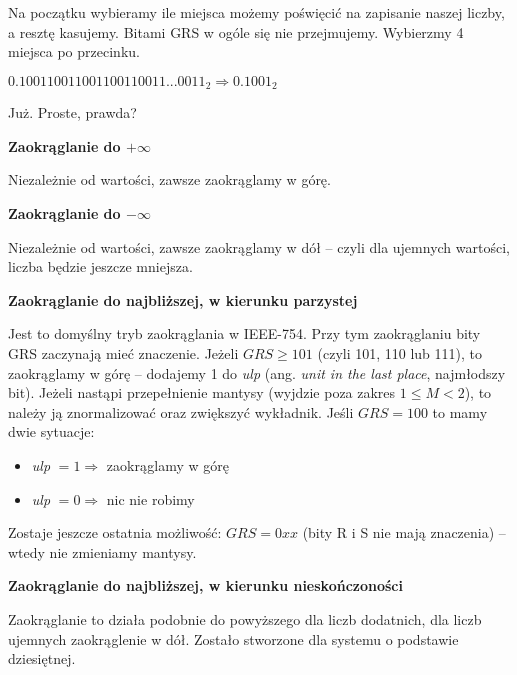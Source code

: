 Na początku wybieramy ile miejsca możemy poświęcić na zapisanie naszej liczby, a resztę kasujemy. Bitami GRS w ogóle się nie przejmujemy.
Wybierzmy 4 miejsca po przecinku.

$0.100110011001100110011...0011_2 \Rightarrow 0.1001_2$

Już. Proste, prawda?

\textbf{Zaokrąglanie do $+\infty$}

Niezależnie od wartości, zawsze zaokrąglamy w górę.

\textbf{Zaokrąglanie do $-\infty$}

Niezależnie od wartości, zawsze zaokrąglamy w dół -- czyli dla ujemnych wartości, liczba będzie jeszcze mniejsza.

\textbf{Zaokrąglanie do najbliższej, w kierunku parzystej}

Jest to domyślny tryb zaokrąglania w IEEE-754. Przy tym zaokrąglaniu bity GRS zaczynają mieć znaczenie. Jeżeli $GRS \ge 101$ (czyli 101, 110 lub 111), to zaokrąglamy w górę -- dodajemy 1 do \textit{ulp} (ang. \textit{unit in the last place}, najmłodszy bit). Jeżeli nastąpi przepełnienie mantysy (wyjdzie poza zakres $1 \le M < 2$), to należy ją znormalizować oraz zwiększyć wykładnik. Jeśli $GRS = 100$ to mamy dwie sytuacje:
\begin{itemize}
\item \textit{ulp} $= 1 \Rightarrow$ zaokrąglamy w górę
\item \textit{ulp} $= 0 \Rightarrow$ nic nie robimy
\end{itemize}
Zostaje jeszcze ostatnia możliwość: $GRS = 0xx$ (bity R i S nie mają znaczenia) -- wtedy nie zmieniamy mantysy.

\textbf{Zaokrąglanie do najbliższej, w kierunku nieskończoności}

Zaokrąglanie to działa podobnie do powyższego dla liczb dodatnich, dla liczb ujemnych zaokrąglenie w dół. Zostało stworzone dla systemu o podstawie dziesiętnej.

